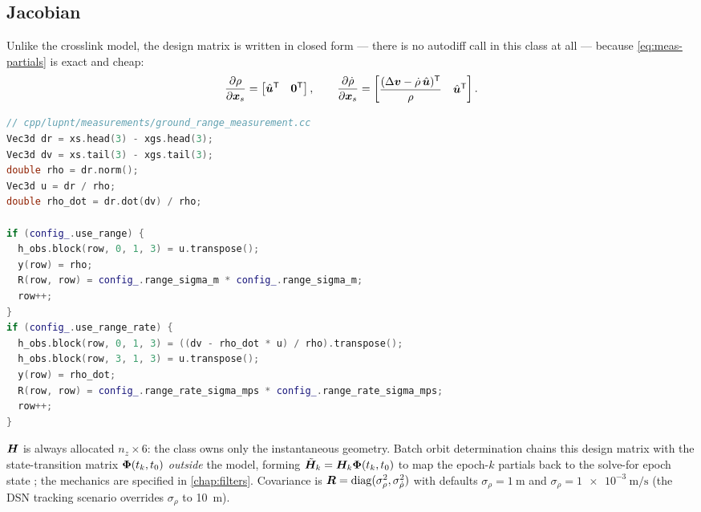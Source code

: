 \subsection{Jacobian}

Unlike the crosslink model, the design matrix is written in closed form ---
there is no autodiff call in this class at all --- because
\cref{eq:meas-partials} is exact and cheap:
\begin{equation}
  \frac{\partial \rho}{\partial \bm{x}_s}
  =
  \begin{bmatrix} \hat{\bm{u}}^{\mathsf{T}} & \bm{0}^{\mathsf{T}} \end{bmatrix},
  \qquad
  \frac{\partial \dot{\rho}}{\partial \bm{x}_s}
  =
  \begin{bmatrix}
    \dfrac{(\Delta\bm{v} - \dot{\rho}\,\hat{\bm{u}})^{\mathsf{T}}}{\rho}
    & \hat{\bm{u}}^{\mathsf{T}}
  \end{bmatrix}.
  \label{eq:meas-gs-jac}
\end{equation}

\begin{lstlisting}[language=cpp, caption={Closed-form ground-station
  observable and design matrix.}, label={lst:meas-gs}]
// cpp/lupnt/measurements/ground_range_measurement.cc
Vec3d dr = xs.head(3) - xgs.head(3);
Vec3d dv = xs.tail(3) - xgs.tail(3);
double rho = dr.norm();
Vec3d u = dr / rho;
double rho_dot = dr.dot(dv) / rho;

if (config_.use_range) {
  h_obs.block(row, 0, 1, 3) = u.transpose();
  y(row) = rho;
  R(row, row) = config_.range_sigma_m * config_.range_sigma_m;
  row++;
}
if (config_.use_range_rate) {
  h_obs.block(row, 0, 1, 3) = ((dv - rho_dot * u) / rho).transpose();
  h_obs.block(row, 3, 1, 3) = u.transpose();
  y(row) = rho_dot;
  R(row, row) = config_.range_rate_sigma_mps * config_.range_rate_sigma_mps;
  row++;
}
\end{lstlisting}

$\bm{H}$ is always allocated $n_z \times 6$: the class owns only the
instantaneous geometry. Batch orbit determination chains this design matrix
with the state-transition matrix $\bm{\Phi}(t_k, t_0)$ \emph{outside} the
model, forming $\tilde{\bm{H}}_k = \bm{H}_k \bm{\Phi}(t_k, t_0)$ to map the
epoch-$k$ partials back to the solve-for epoch state \citep{tapley2004}; the
mechanics are specified in \cref{chap:filters}. Covariance is
$\bm{R} = \operatorname{diag}(\sigma_\rho^2, \sigma_{\dot\rho}^2)$ with defaults
$\sigma_\rho = \SI{1}{\meter}$ and
$\sigma_{\dot\rho} = \SI{1e-3}{\meter\per\second}$ (the DSN tracking scenario
overrides $\sigma_\rho$ to \SI{10}{\meter}).

